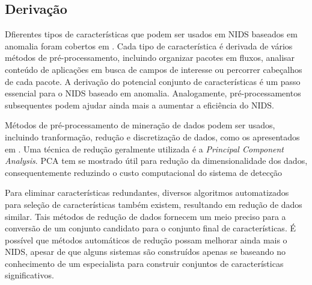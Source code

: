 \subsection{Derivação}
Dfierentes tipos de características que podem ser usados em NIDS baseados em anomalia foram cobertos em \cite{davis11}.
Cada tipo de característica é derivada de vários métodos de pré-processamento, incluindo organizar pacotes em fluxos,
analisar conteúdo de aplicações em busca de campos de interesse ou percorrer cabeçalhos de cada pacote. A derivação do
potencial conjunto de características é um passo essencial para o NIDS baseado em anomalia. Analogamente,
pré-processamentos subsequentes podem ajudar ainda mais a aumentar a eficiência do NIDS.
\par Métodos de pré-processamento de mineração de dados podem ser usados, incluindo tranformação, redução e
discretização de dados, como os apresentados em \cite{ribeiro08}. Uma técnica de redução geralmente utilizada é a
\textit{Principal Component Analysis}. PCA tem se mostrado útil para redução da dimensionalidade dos dados,
consequentemente reduzindo o custo computacional do sistema de detecção
\par Para eliminar características redundantes, diversos algoritmos automatizados para seleção de características
também existem, resultando em redução de dados similar. Tais métodos de redução de dados fornecem um meio preciso para
a conversão de um conjunto candidato para o conjunto final de características. É possível que métodos automáticos de
redução possam melhorar ainda mais o NIDS, apesar de que alguns sistemas são construídos apenas se baseando no
conhecimento de um especialista para construir conjuntos de características significativos.

